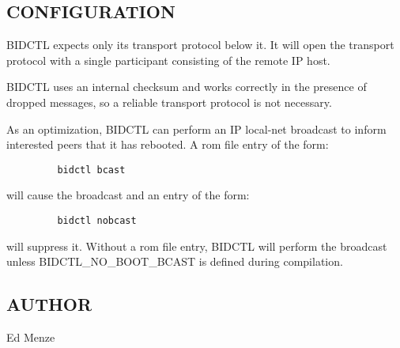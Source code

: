 \subsection*{CONFIGURATION}

BIDCTL expects only its transport protocol below it.  It will open the
transport protocol with a single participant consisting of the remote
IP host. 

BIDCTL uses an internal checksum and works correctly in the presence
of dropped messages, so a reliable transport protocol is not
necessary. 

As an optimization, BIDCTL can perform an IP local-net broadcast to
inform interested peers that it has rebooted.  A rom file entry of the
form:
\begin{verbatim}
         bidctl	bcast
\end{verbatim}
will cause the broadcast and an entry of the form:
\begin{verbatim}
         bidctl	nobcast
\end{verbatim}
will suppress it.  Without a rom file entry, BIDCTL will perform the broadcast
unless BIDCTL\_NO\_BOOT\_BCAST is defined during
compilation. 


\subsection*{AUTHOR}

\noindent Ed Menze

